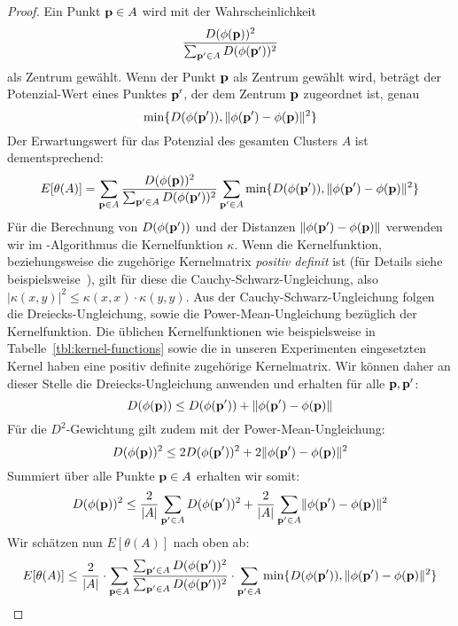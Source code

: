 \begin{proof}
	Ein Punkt $\mathbf{p} \in A$ wird mit der Wahrscheinlichkeit
	\[ \frac{D(\phi(\mathbf{p}))^2}{\sum_{\mathbf{p}' \in A} D(\phi(\mathbf{p}'))^2} \]
	als Zentrum gewählt. Wenn der Punkt $\mathbf{p}$ als Zentrum gewählt wird, beträgt der Potenzial-Wert eines Punktes $\mathbf{p'}$,
	der dem Zentrum $\mathbf{p}$ zugeordnet ist, genau
	\[ \min \{ D(\phi(\mathbf{p}')), \lVert {\phi(\ensuremath{\mathbf{p}}')} - {\phi(\mathbf{p})} \rVert^2 \} \]
	Der Erwartungswert für das Potenzial des gesamten Clusters $A$ ist dementsprechend:
	\[  E[\theta(A)] = \sum_{\mathbf{p} \in A} \frac{D(\phi(\mathbf{p}))^2}{\sum_{\mathbf{p}' \in A} D(\phi(\mathbf{p}'))^2}
		\sum_{\mathbf{p}' \in A} \min \{ D(\phi(\mathbf{p}')), \lVert {\phi(\ensuremath{\mathbf{p}}')} - {\phi(\mathbf{p})} \rVert^2 \} \]
	Für die Berechnung von $D(\phi(\mathbf{p}'))$ und der Distanzen $\lVert {\phi(\ensuremath{\mathbf{p}}')} - {\phi(\mathbf{p})} \rVert$ verwenden
	wir im \kkmpp-Algorithmus die Kernelfunktion $\kappa$. Wenn die Kernelfunktion, beziehungsweise die zugehörige
	Kernelmatrix \emph{positiv definit} ist (für Details siehe beispielsweise~\cite{Shawe-TaylorC04}), gilt für diese die
	Cauchy-Schwarz-Ungleichung, also $\left|\kappa(x,y)\right|^2 \leq \kappa(x,x) \cdot \kappa(y,y)$.
	Aus der Cauchy-Schwarz-Ungleichung folgen die Dreiecks-Ungleichung, sowie die Power-Mean-Ungleichung bezüglich der
	Kernelfunktion. Die üblichen Kernelfunktionen wie beispielsweise in Tabelle~\ref{tbl:kernel-functions} sowie die
	in unseren Experimenten eingesetzten Kernel haben eine positiv definite zugehörige Kernelmatrix. Wir können daher an
	dieser Stelle die Dreiecks-Ungleichung anwenden und erhalten für alle $\mathbf{p}, \mathbf{p}'$:
	\[ D(\phi(\mathbf{p})) \leq D(\phi(\mathbf{p}')) + \lVert {\phi(\ensuremath{\mathbf{p}}')} - {\phi(\mathbf{p})} \rVert \]
	Für die $D^2$-Gewichtung gilt zudem mit der Power-Mean-Ungleichung:
	\[ D(\phi(\mathbf{p}))^2 \leq 2 D(\phi(\mathbf{p}'))^2 + 2 \lVert {\phi(\ensuremath{\mathbf{p}}')} - {\phi(\mathbf{p})} \rVert^2 \]
	Summiert über alle Punkte $\mathbf{p} \in A$ erhalten wir somit:
	\[ D(\phi(\mathbf{p}))^2 \leq \frac{2}{\left|A\right|} \sum_{\mathbf{p}' \in A} D(\phi(\mathbf{p}'))^2
		+ \frac{2}{\left|A\right|} \sum_{\mathbf{p}' \in A} \lVert {\phi(\ensuremath{\mathbf{p}}')} - {\phi(\mathbf{p})} \rVert^2 \]
	Wir schätzen nun $E[\theta(A)]$ nach oben ab:
	\begin{align*}
		E[\theta(A)] 	&\leq \frac{2}{\left|A\right|} \cdot \sum_{\vect{p} \in A} \frac{\sum_{\vect{p}' \in A} D(\phi(\vect{p}'))^2}{\sum_{\vect{p}' \in A} D(\phi(\vect{p}'))^2}
								\cdot \sum_{\vect{p}' \in A} \min \{ D(\phi(\vect{p}')), \EuclidSquared{\phi(\vect{p}')}{\phi(\vect{p})} \} \\

\end{align*}
\end{proof}
